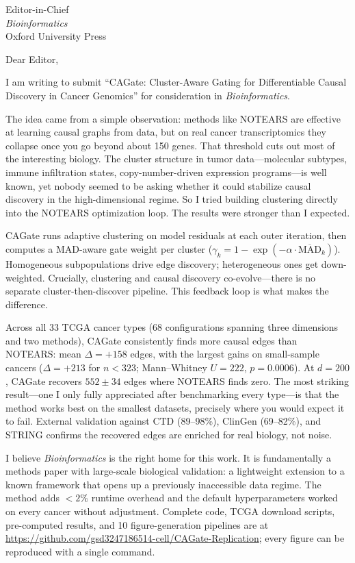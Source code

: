 \documentclass[12pt]{letter}
\begin{document}
\begin{letter}{Editor-in-Chief\\\textit{Bioinformatics}\\Oxford University Press}

\opening{Dear Editor,}

I am writing to submit ``CAGate: Cluster-Aware Gating for Differentiable Causal Discovery in Cancer Genomics'' for consideration in \textit{Bioinformatics}.

The idea came from a simple observation: methods like NOTEARS are effective at learning causal graphs from data, but on real cancer transcriptomics they collapse once you go beyond about 150 genes. That threshold cuts out most of the interesting biology. The cluster structure in tumor data---molecular subtypes, immune infiltration states, copy-number-driven expression programs---is well known, yet nobody seemed to be asking whether it could stabilize causal discovery in the high-dimensional regime. So I tried building clustering directly into the NOTEARS optimization loop. The results were stronger than I expected.

CAGate runs adaptive clustering on model residuals at each outer iteration, then computes a MAD-aware gate weight per cluster ($\gamma_k = 1 - \exp(-\alpha \cdot \overline{\mathrm{MAD}}_k)$). Homogeneous subpopulations drive edge discovery; heterogeneous ones get down-weighted. Crucially, clustering and causal discovery co-evolve---there is no separate cluster-then-discover pipeline. This feedback loop is what makes the difference.

Across all 33 TCGA cancer types (68 configurations spanning three dimensions and two methods), CAGate consistently finds more causal edges than NOTEARS: mean $\Delta = +158$ edges, with the largest gains on small-sample cancers ($\Delta = +213$ for $n < 323$; Mann--Whitney $U = 222$, $p = 0.0006$). At $d = 200$, CAGate recovers $552 \pm 34$ edges where NOTEARS finds zero. The most striking result---one I only fully appreciated after benchmarking every type---is that the method works best on the smallest datasets, precisely where you would expect it to fail. External validation against CTD (89--98\%), ClinGen (69--82\%), and STRING confirms the recovered edges are enriched for real biology, not noise.

I believe \textit{Bioinformatics} is the right home for this work. It is fundamentally a methods paper with large-scale biological validation: a lightweight extension to a known framework that opens up a previously inaccessible data regime. The method adds $<2\%$ runtime overhead and the default hyperparameters worked on every cancer without adjustment. Complete code, TCGA download scripts, pre-computed results, and 10 figure-generation pipelines are at \url{https://github.com/gsd3247186514-cell/CAGate-Replication}; every figure can be reproduced with a single command.


\end{letter}
\end{document}
